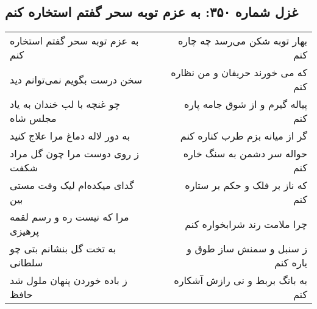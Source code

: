 \begin{center}
\section*{غزل شماره ۳۵۰: به عزم توبه سحر گفتم استخاره کنم}
\label{sec:sh350}
\begin{longtable}{l p{0.5cm} r}
به عزم توبه سحر گفتم استخاره کنم
&&
بهار توبه شکن می‌رسد چه چاره کنم
\\
سخن درست بگویم نمی‌توانم دید
&&
که می خورند حریفان و من نظاره کنم
\\
چو غنچه با لب خندان به یاد مجلس شاه
&&
پیاله گیرم و از شوق جامه پاره کنم
\\
به دور لاله دماغ مرا علاج کنید
&&
گر از میانه بزم طرب کناره کنم
\\
ز روی دوست مرا چون گل مراد شکفت
&&
حواله سر دشمن به سنگ خاره کنم
\\
گدای میکده‌ام لیک وقت مستی بین
&&
که ناز بر فلک و حکم بر ستاره کنم
\\
مرا که نیست ره و رسم لقمه پرهیزی
&&
چرا ملامت رند شرابخواره کنم
\\
به تخت گل بنشانم بتی چو سلطانی
&&
ز سنبل و سمنش ساز طوق و یاره کنم
\\
ز باده خوردن پنهان ملول شد حافظ
&&
به بانگ بربط و نی رازش آشکاره کنم
\\
\end{longtable}
\end{center}
